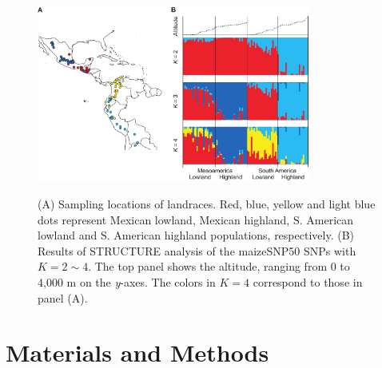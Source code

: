 
\begin{figure}[tb]   
  \begin{center}
   \vspace{-0mm}
   \includegraphics[width=0.8\textwidth]{fig/Fig2}
   \renewcommand{\baselinestretch}{0.9}
   \vspace{-3mm}
   \caption{(A) Sampling locations of landraces.  Red, blue, yellow and light blue dots represent Mexican lowland, Mexican highland, S. American lowland and S. American highland populations, respectively.  (B) Results of {\sf STRUCTURE} analysis of the maizeSNP50 SNPs with $K=2\sim4$.  The top panel shows the altitude, ranging from 0 to 4,000 m on the \emph{y}-axes.  The colors in $K=4$ correspond to those in panel (A).    }
\vspace{-6mm}
    \label{map}
  \end{center}
\end{figure}

\section*{Materials and Methods}

